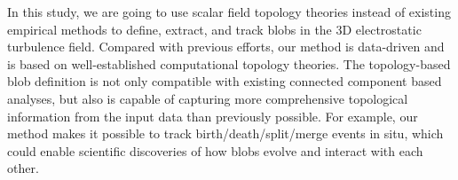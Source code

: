 In this study, we are going to use scalar field topology theories instead of existing empirical methods to define, extract, and track blobs in the 3D electrostatic turbulence field.  Compared with previous efforts, our method is data-driven and is based on well-established computational topology theories.  The topology-based blob definition is not only compatible with existing connected component based analyses, but also is capable of capturing more comprehensive topological information from the input data than previously possible.  For example, our method makes it possible to track birth/death/split/merge events in situ, which could enable scientific discoveries of how blobs evolve and interact with each other.  




